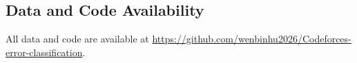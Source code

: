 \documentclass[10pt,a4paper]{article}
\begin{document}
\subsection*{Data and Code Availability}
\begin{sloppypar}\raggedright
All data and code are available at \url{https://github.com/wenbinhu2026/Codeforces-error-classification}.
\end{sloppypar}



\end{document}
